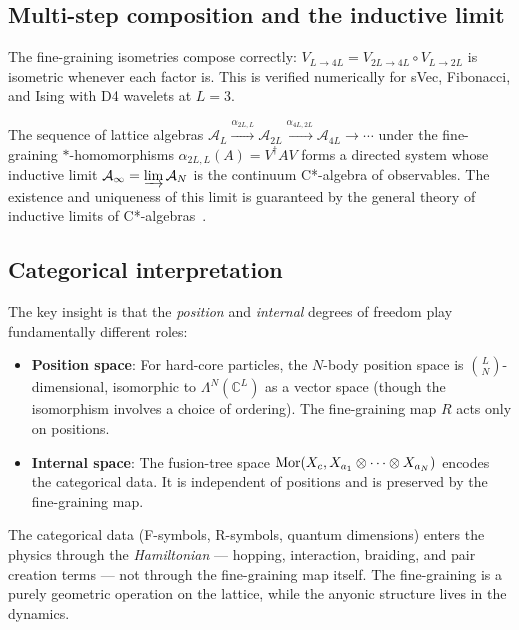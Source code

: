 \subsection{Multi-step composition and the inductive limit}

The fine-graining isometries compose correctly: $V_{L \to 4L} = V_{2L \to 4L} \circ V_{L \to 2L}$ is isometric whenever each factor is. This is verified numerically for sVec, Fibonacci, and Ising with D4 wavelets at $L = 3$.

The sequence of lattice algebras $\mathcal{A}_L \xrightarrow{\alpha_{2L,L}} \mathcal{A}_{2L} \xrightarrow{\alpha_{4L,2L}} \mathcal{A}_{4L} \to \cdots$ under the fine-graining $*$-homomorphisms $\alpha_{2L,L}(A) = V^\dagger A V$ forms a directed system whose inductive limit $\mathcal{A}_\infty = \varinjlim \mathcal{A}_N$ is the continuum C*-algebra of observables. The existence and uniqueness of this limit is guaranteed by the general theory of inductive limits of C*-algebras~\cite{OsborneStottmeister2022}.

\subsection{Categorical interpretation}

The key insight is that the \emph{position} and \emph{internal} degrees of freedom play fundamentally different roles:
\begin{itemize}
    \item \textbf{Position space}: For hard-core particles, the $N$-body position space is $\binom{L}{N}$-dimensional, isomorphic to $\Lambda^N(\mathbb{C}^L)$ as a vector space (though the isomorphism involves a choice of ordering). The fine-graining map $R$ acts only on positions.
    \item \textbf{Internal space}: The fusion-tree space $\operatorname{Mor}(X_c, X_{a_1} \otimes \cdots \otimes X_{a_N})$ encodes the categorical data. It is independent of positions and is preserved by the fine-graining map.
\end{itemize}

The categorical data (F-symbols, R-symbols, quantum dimensions) enters the physics through the \emph{Hamiltonian} --- hopping, interaction, braiding, and pair creation terms --- not through the fine-graining map itself. The fine-graining is a purely geometric operation on the lattice, while the anyonic structure lives in the dynamics.
